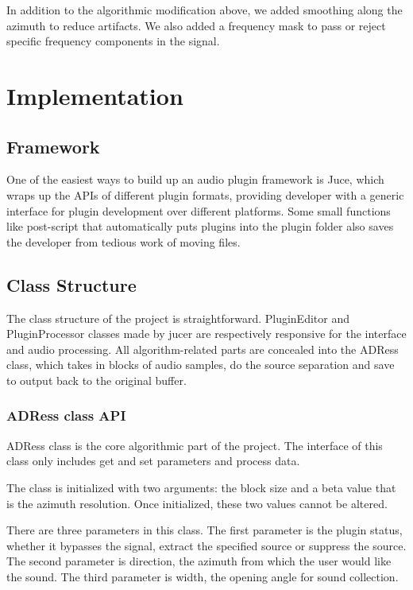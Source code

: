\documentclass{sig-alternate}
\begin{document}
In addition to the algorithmic modification above, we added smoothing along the azimuth to reduce artifacts. We also added a frequency mask to pass or reject specific frequency components in the signal.


\section{Implementation}\label{sec:implementation}

\subsection{Framework}
        
One of the easiest ways to build up an audio plugin framework is Juce, which wraps up the APIs of different plugin formats, providing developer with a generic interface for plugin development over different platforms. Some small functions like post-script that automatically puts plugins into the plugin folder also saves the developer from tedious work of moving files.

\subsection{Class Structure}

The class structure of the project is straightforward. PluginEditor and PluginProcessor classes made by jucer are respectively responsive for the interface and audio processing. All algorithm-related parts are concealed into the ADRess class, which takes in blocks of audio samples, do the source separation and save to output back to the original buffer.

\subsubsection{ADRess class API}

ADRess class is the core algorithmic part of the project. The interface of this class only includes get and set parameters and process data.

The class is initialized with two arguments: the block size and a beta value that is the azimuth resolution. Once initialized, these two values cannot be altered.
     
There are three parameters in this class. The first parameter is the plugin status, whether it bypasses the signal, extract the specified source or suppress the source. The second parameter is direction, the azimuth from which the user would like the sound. The third parameter is width, the opening angle for sound collection. 
 
\end{document}
